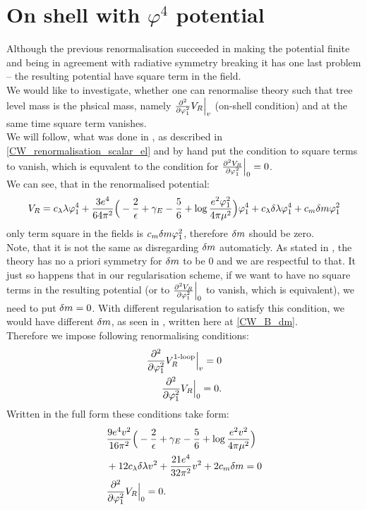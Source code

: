 \section{On shell with \texorpdfstring{$\varphi^4$}{phi to the fourth} potential}\label{onshellphi4}
Although the previous renormalisation succeeded in making the potential finite and being in 
agreement with radiative symmetry breaking it has one last problem -- the resulting potential have 
square term in the field. \\
We would like to investigate, whether one can renormalise theory such that tree 
level mass is the phsical mass, namely $\frac{\partial^2 }{\partial \varphi_1^2}V_R\Big|_{v}$ (on-shell condition) and at the 
same time square term vanishes. \\
We will follow, what was done in \cite{Coleman1973}, as described in 
\ref{CW_renormalisation_scalar_el} and by hand put the condition to square terms to vanish, 
which is equvalent to the condition for $\frac{\partial^2 V_R}{\partial \varphi_1^2}\Big|_{0} = 0$. \\
We can see, that in the renormalised potential:
\begin{align}
V_R = c_\lambda\lambda\varphi_1^4 + \frac{3e^4}{64\pi^2}\Big(-\frac{2}{\epsilon}+\gamma_E- 
\frac{5}{6}+
\log{\frac{e^2\varphi_1^2}{4\pi\mu^2}}\Big)\varphi_1^4 + c_\lambda\delta\lambda\varphi_1^4+c_m\delta m\varphi_1^2
\end{align}
only term square in the fields is $c_m\delta m\varphi_1^2$, therefore $\delta m$ should be zero. \\
Note, that it is not the same as disregarding $\delta m$ automaticly. As stated in \cite{Coleman1973}, 
the theory has no a priori symmetry for $\delta m$ to be $0$ and we are respectful to that. 
It just so happens that in our regularisation scheme, if we want to have no square terms in the 
resulting potential (or to $\frac{\partial^2 V_R}{\partial \varphi_1^2}\Big|_{0}$ to vanish, which is equivalent), we need to put 
$\delta m = 0$. With different regularisation to satisfy this condition, we would have different $\delta m$, 
as seen in \cite{Coleman1973}, written here at \ref{CW_B_dm}. \\
Therefore we impose following renormalising conditions:
\begin{align}
\frac{\partial^2 }{\partial \varphi_1^2}V_R^{\textrm{1-loop}}\Big|_{v}=0 \\
\frac{\partial^2 }{\partial \varphi_1^2}V_R\Big|_{0}=0.
\end{align}
Written in the full form these conditions take form:
\begin{align}
&\frac{9e^4v^2}{16\pi^2}\Big(-\frac{2}{\epsilon}+\gamma_E-\frac{5}{6}+\log\frac{e^2
v^2}{4\pi\mu^2}\Big) \notag\\
&+12c_\lambda\delta\lambda v^2+\frac{21e^4}{32\pi^2}v^2+2c_m\delta m = 0 \\
&\frac{\partial^2 }{\partial \varphi_1^2}V_R\Big|_{0} = 0.
\end{align}
